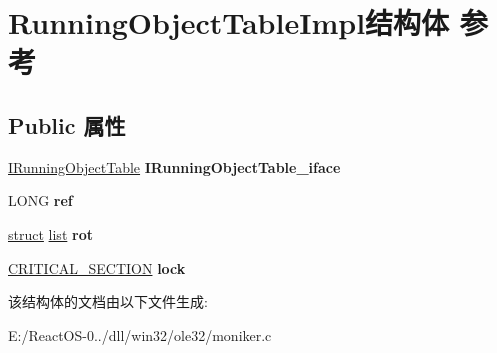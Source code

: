 \hypertarget{struct_running_object_table_impl}{}\section{Running\+Object\+Table\+Impl结构体 参考}
\label{struct_running_object_table_impl}
\subsection*{Public 属性}
\begin{DoxyCompactItemize}
\item 
\mbox{\label{struct_running_object_table_impl_a87ac731c8187965f790822329753f773}} 
\hyperlink{interface_i_running_object_table}{I\+Running\+Object\+Table} {\bfseries I\+Running\+Object\+Table\+\_\+iface}
\item 
\mbox{\label{struct_running_object_table_impl_aaa96aab2250894045f5247dc55f0f40c}} 
L\+O\+NG {\bfseries ref}
\item 
\mbox{\label{struct_running_object_table_impl_a3cb11afd16d7500d67b0d98a84cce2f9}} 
\hyperlink{interfacestruct}{struct} \hyperlink{classlist}{list} {\bfseries rot}
\item 
\mbox{\label{struct_running_object_table_impl_aa8db0024e512cb0aefeb499ad893d305}} 
\hyperlink{struct___c_r_i_t_i_c_a_l___s_e_c_t_i_o_n}{C\+R\+I\+T\+I\+C\+A\+L\+\_\+\+S\+E\+C\+T\+I\+ON} {\bfseries lock}
\end{DoxyCompactItemize}


该结构体的文档由以下文件生成\+:\begin{DoxyCompactItemize}
\item 
E\+:/\+React\+O\+S-\/0../dll/win32/ole32/moniker.\+c\end{DoxyCompactItemize}
